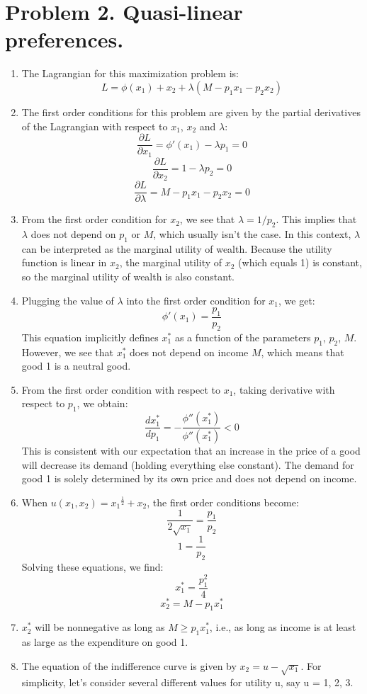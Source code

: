 \documentclass[UTF8,titlepage]{article}
\numberwithin{figure}{section}
\begin{document}
\section{Problem 2. Quasi-linear preferences.}
\begin{enumerate}
  \item The Lagrangian for this maximization problem is:
  \[L = \phi(x_1) + x_2 + \lambda(M - p_1x_1 - p_2x_2)\]
  \item The first order conditions for this problem are given by the partial derivatives of the Lagrangian with respect to $x_1$, $x_2$ and $\lambda$:
  \[\frac{\partial L}{\partial x_1} = \phi'(x_1) - \lambda p_1 = 0\]
  \[\frac{\partial L}{\partial x_2} = 1 - \lambda p_2 = 0\]
  \[\frac{\partial L}{\partial \lambda} = M - p_1 x_1 - p_2 x_2 = 0\]
  \item From the first order condition for $x_2$, we see that $\lambda = 1/p_2$. This implies that $\lambda$ does not depend on $p_1$ or $M$, which usually isn't the case. In this context, $\lambda$ can be interpreted as the marginal utility of wealth. Because the utility function is linear in $x_2$, the marginal utility of $x_2$ (which equals 1) is constant, so the marginal utility of wealth is also constant.
  \item Plugging the value of $\lambda$ into the first order condition for $x_1$, we get:
  \[\phi'(x_1) = \frac{p_1}{p_2}\]
  This equation implicitly defines $x_1^*$ as a function of the parameters $p_1$, $p_2$, $M$. However, we see that $x_1^*$ does not depend on income $M$, which means that good 1 is a neutral good.
  \item From the first order condition with respect to $x_1$, taking derivative with respect to $p_1$, we obtain:
  \[\frac{d x_1^*}{dp_1} = -\frac{\phi''(x_1^*)}{\phi''(x_1^*)} < 0\]
  This is consistent with our expectation that an increase in the price of a good will decrease its demand (holding everything else constant). The demand for good 1 is solely determined by its own price and does not depend on income.
  \item When $u(x_1, x_2) = {x_1}^{\frac{1}{2}} + x_2$, the first order conditions become:
  \[\frac{1}{2\sqrt{x_1}} = \frac{p_1}{p_2}\]
  \[1 = \frac{1}{p_2}\]
  Solving these equations, we find:
  \[x_1^* = \frac{p_1^2}{4}\]
  \[x_2^* = M - p_1 x_1^*\]
  \item $x_2^*$ will be nonnegative as long as $M \geq p_1 x_1^*$, i.e., as long as income is at least as large as the expenditure on good 1.
  \item The equation of the indifference curve is given by $x_2 = u - \sqrt{x_1}$. For simplicity, let's consider several different values for utility u, say u = 1, 2, 3.
  

\end{enumerate}
\end{document}

